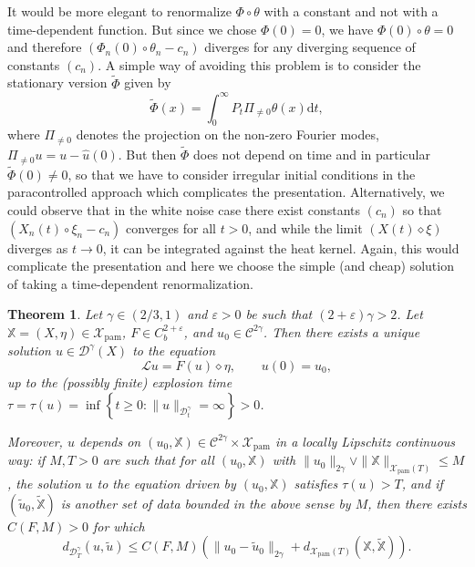 \documentclass[a4paper,11pt]{article}
\newcommand{\mathd}{\mathrm{d}}
\newcommand{\tmop}[1]{\ensuremath{\operatorname{#1}}}
\newtheorem{theorem}{Theorem}
\newcommand{\LL}{\mathscr{L}}
\newcommand{\CC}{\mathscr{C}}
\newcommand{\CD}{\mathscr{D}}
\newcommand{\reso}{\,\mathord{\circ}\,}
\newcommand{\renorm}{\,\mathord{\diamond}\,}
\begin{document}
\begin{remark}
  It would be more elegant to renormalize $\Phi \reso \theta$ with a constant
  and not with a time-dependent function. But since we chose $\Phi (0) = 0$,
  we have $\Phi (0) \reso \theta = 0$ and therefore $(\Phi_n (0) \reso
  \theta_n - c_n)$ diverges for any diverging sequence of constants $(c_n)$. A
  simple way of avoiding this problem is to consider the stationary version
  $\tilde{\Phi}$ given by
  \[ \tilde{\Phi} (x) = \int_0^{\infty} P_t \Pi_{\neq 0} \theta (x) \mathd t,
  \]
  where $\Pi_{\neq 0}$ denotes the projection on the non-zero Fourier modes,
  $\Pi_{\neq 0} u = u - \hat{u} (0)$. But then $\tilde{\Phi}$ does not depend
  on time and in particular $\tilde{\Phi} (0) \neq 0$, so that we have to
  consider irregular initial conditions in the paracontrolled approach which
  complicates the presentation. Alternatively, we could observe that in the
  white noise case there exist constants $(c_n)$ so that $(X_n (t) \reso \xi_n
  - c_n)$ converges for all $t > 0$, and while the limit $(X (t) \renorm
  \xi)$ diverges as $t \rightarrow 0$, it can be integrated against the heat
  kernel. Again, this would complicate the presentation and here we choose the
  simple (and cheap) solution of taking a time-dependent renormalization.
\end{remark}

\begin{theorem}
  \label{thm:pam}Let $\gamma \in (2 / 3, 1)$ and $\varepsilon > 0$ be such
  that $(2 + \varepsilon) \gamma > 2$. Let $\mathbb{X}= (X, \eta) \in
  \mathcal{X}_{\tmop{pam}}$, $F \in C^{2 + \varepsilon}_b$, and $u_0 \in
  \CC^{2 \gamma}$. Then there exists a unique solution $u \in \CD^{\gamma}
  (X)$ to the equation
  \[ \LL u = F (u) \renorm \eta, \hspace{2em} u (0) = u_0, \]
  up to the (possibly finite) explosion time $\tau = \tau (u) = \inf \left\{ t
  \geqslant 0 : \| u \|_{\CD^{\gamma}_t} = \infty \right\} > 0$.
  
  Moreover, $u$ depends on $(u_0, \mathbb{X}) \in \CC^{2 \gamma} \times
  \mathcal{X}_{\tmop{pam}}$ in a locally Lipschitz continuous way: if $M, T >
  0$ are such that for all $(u_0, \mathbb{X})$ with $\| u_0 \|_{2 \gamma}
  \vee \| \mathbb{X} \|_{\mathcal{X}_{\tmop{pam}} (T)} \leqslant M$, the
  solution $u$ to the equation driven by $(u_0, \mathbb{X})$ satisfies $\tau
  (u) > T$, and if $(\tilde{u}_0, \tilde{\mathbb{X}})$ is another set of data
  bounded in the above sense by $M$, then there exists $C (F, M) > 0$ for
  which
  \[ d_{\CD^{\gamma}_T} (u, \tilde{u}) \leqslant C (F, M) (\| u_0 -
     \tilde{u}_0 \|_{2 \gamma} + d_{\mathcal{X}_{\tmop{pam}} (T)}
     (\mathbb{X}, \tilde{\mathbb{X}})) . \]
\end{theorem}
\end{document}
